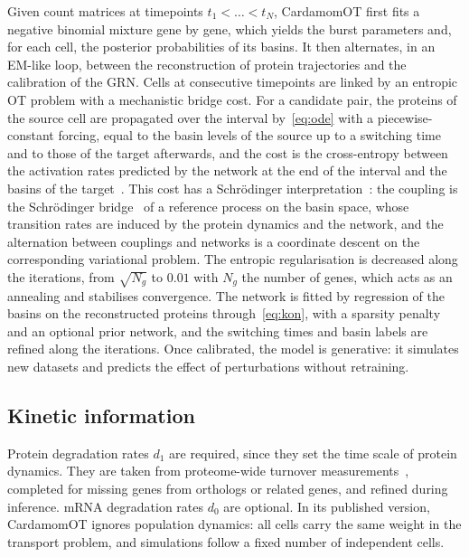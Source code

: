 \documentclass[a4paper, 11pt]{article}
\theoremstyle{plain}
\theoremstyle{remark}
\begin{document}
Given count matrices at timepoints $t_1 < \dots < t_N$, CardamomOT first fits a negative binomial mixture gene by gene, which yields the burst parameters and, for each cell, the posterior probabilities of its basins. It then alternates, in an EM-like loop, between the reconstruction of protein trajectories and the calibration of the GRN. Cells at consecutive timepoints are linked by an entropic OT problem with a mechanistic bridge cost. For a candidate pair, the proteins of the source cell are propagated over the interval by~\eqref{eq:ode} with a piecewise-constant forcing, equal to the basin levels of the source up to a switching time and to those of the target afterwards, and the cost is the cross-entropy between the activation rates predicted by the network at the end of the interval and the basins of the target~\cite[Appendix~A]{mauge2026cardamomot}. This cost has a Schrödinger interpretation~\cite[Appendix~B]{mauge2026cardamomot}: the coupling is the Schrödinger bridge~\cite{leonard2012schrodinger} of a reference process on the basin space, whose transition rates are induced by the protein dynamics and the network, and the alternation between couplings and networks is a coordinate descent on the corresponding variational problem. The entropic regularisation is decreased along the iterations, from $\sqrt{N_g}$ to $0.01$ with $N_g$ the number of genes, which acts as an annealing and stabilises convergence. The network is fitted by regression of the basins on the reconstructed proteins through~\eqref{eq:kon}, with a sparsity penalty and an optional prior network, and the switching times and basin labels are refined along the iterations. Once calibrated, the model is generative: it simulates new datasets and predicts the effect of perturbations without retraining.

\subsection{Kinetic information}

Protein degradation rates $d_1$ are required, since they set the time scale of protein dynamics. They are taken from proteome-wide turnover measurements~\cite{schwanhausser2011global, mathieson2018turnover}, completed for missing genes from orthologs or related genes, and refined during inference. mRNA degradation rates $d_0$ are optional. In its published version, CardamomOT ignores population dynamics: all cells carry the same weight in the transport problem, and simulations follow a fixed number of independent cells.
\end{document}
